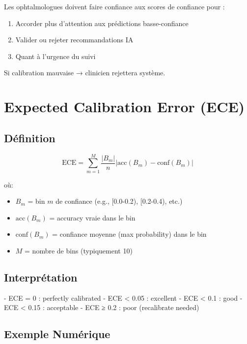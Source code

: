 \documentclass[12pt,a4paper,oneside]{report}
\begin{document}
Les ophtalmologues doivent faire confiance aux scores de confiance 
pour :
\begin{enumerate}
    \item Accorder plus d'attention aux prédictions basse-confiance
    \item Valider ou rejeter recommandations IA
    \item Quant à l'urgence du suivi
\end{enumerate}

Si calibration mauvaise → clinicien rejettera système.

\section{Expected Calibration Error (ECE)}

\subsection{Définition}

\begin{equation}
\text{ECE} = \sum_{m=1}^{M} \frac{|B_m|}{n} 
\left| \text{acc}(B_m) - \text{conf}(B_m) \right|
\label{eq:ece_full}
\end{equation}

où:
\begin{itemize}
    \item $B_m$ = bin $m$ de confiance (e.g., [0.0-0.2), [0.2-0.4), etc.)
    \item $\text{acc}(B_m)$ = accuracy vraie dans le bin
    \item $\text{conf}(B_m)$ = confiance moyenne (max probability) 
          dans le bin
    \item $M$ = nombre de bins (typiquement 10)
\end{itemize}

\subsection{Interprétation}

- ECE = 0 : perfectly calibrated
- ECE < 0.05 : excellent       
- ECE < 0.1 : good
- ECE < 0.15 : acceptable
- ECE ≥ 0.2 : poor (recalibrate needed)

\subsection{Exemple Numérique}
\end{document}
